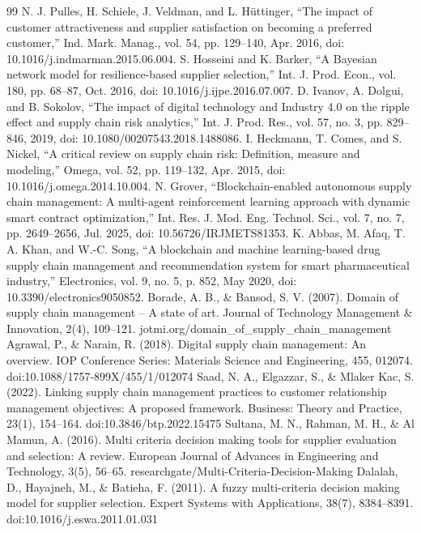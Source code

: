\documentclass[11pt]{article}
\begin{document}
\begin{thebibliography}{99}
 N. J. Pulles, H. Schiele, J. Veldman, and L. Hüttinger, ``The impact of customer attractiveness and supplier satisfaction on becoming a preferred customer,'' Ind. Mark. Manag., vol. 54, pp. 129--140, Apr. 2016, doi: 10.1016/j.indmarman.2015.06.004.
 S. Hosseini and K. Barker, ``A Bayesian network model for resilience-based supplier selection,'' Int. J. Prod. Econ., vol. 180, pp. 68--87, Oct. 2016, doi: 10.1016/j.ijpe.2016.07.007.
 D. Ivanov, A. Dolgui, and B. Sokolov, ``The impact of digital technology and Industry 4.0 on the ripple effect and supply chain risk analytics,'' Int. J. Prod. Res., vol. 57, no. 3, pp. 829--846, 2019, doi: 10.1080/00207543.2018.1488086.
 I. Heckmann, T. Comes, and S. Nickel, ``A critical review on supply chain risk: Definition, measure and modeling,'' Omega, vol. 52, pp. 119--132, Apr. 2015, doi: 10.1016/j.omega.2014.10.004.
 N. Grover, ``Blockchain-enabled autonomous supply chain management: A multi-agent reinforcement learning approach with dynamic smart contract optimization,'' Int. Res. J. Mod. Eng. Technol. Sci., vol. 7, no. 7, pp. 2649--2656, Jul. 2025, doi: 10.56726/IRJMETS81353.
 K. Abbas, M. Afaq, T. A. Khan, and W.-C. Song, ``A blockchain and machine learning-based drug supply chain management and recommendation system for smart pharmaceutical industry,'' Electronics, vol. 9, no. 5, p. 852, May 2020, doi: 10.3390/electronics9050852.
 Borade, A. B., \& Bansod, S. V. (2007). Domain of supply chain management -- A state of art. Journal of Technology Management \& Innovation, 2(4), 109--121. jotmi.org/domain\_of\_supply\_chain\_management
 Agrawal, P., \& Narain, R. (2018). Digital supply chain management: An overview. IOP Conference Series: Materials Science and Engineering, 455, 012074. doi:10.1088/1757-899X/455/1/012074
 Saad, N. A., Elgazzar, S., \& Mlaker Kac, S. (2022). Linking supply chain management practices to customer relationship management objectives: A proposed framework. Business: Theory and Practice, 23(1), 154--164. doi:10.3846/btp.2022.15475
 Sultana, M. N., Rahman, M. H., \& Al Mamun, A. (2016). Multi criteria decision making tools for supplier evaluation and selection: A review. European Journal of Advances in Engineering and Technology, 3(5), 56--65. researchgate/Multi-Criteria-Decision-Making
 Dalalah, D., Hayajneh, M., \& Batieha, F. (2011). A fuzzy multi-criteria decision making model for supplier selection. Expert Systems with Applications, 38(7), 8384--8391. doi:10.1016/j.eswa.2011.01.031

\end{thebibliography}
\end{document}
